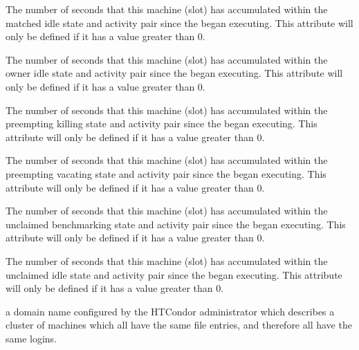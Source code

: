 \begin{description}
%
\item[\AdAttr{TotalTimeMatchedIdle}:] The number of seconds
that this machine (slot) has accumulated within the
matched idle state and activity pair since the 
began executing.
This attribute will only be defined if it has a value greater than 0.
%
\item[\AdAttr{TotalTimeOwnerIdle}:] The number of seconds
that this machine (slot) has accumulated within the
owner idle state and activity pair since the 
began executing.
This attribute will only be defined if it has a value greater than 0.
%
\item[\AdAttr{TotalTimePreemptingKilling}:] The number of seconds
that this machine (slot) has accumulated within the
preempting killing state and activity pair since the 
began executing.
This attribute will only be defined if it has a value greater than 0.
%
\item[\AdAttr{TotalTimePreemptingVacating}:] The number of seconds
that this machine (slot) has accumulated within the
preempting vacating state and activity pair since the 
began executing.
This attribute will only be defined if it has a value greater than 0.
%
\item[\AdAttr{TotalTimeUnclaimedBenchmarking}:] The number of seconds
that this machine (slot) has accumulated within the
unclaimed benchmarking state and activity pair since the 
began executing.
This attribute will only be defined if it has a value greater than 0.
%
\item[\AdAttr{TotalTimeUnclaimedIdle}:] The number of seconds
that this machine (slot) has accumulated within the
unclaimed idle state and activity pair since the 
began executing.
This attribute will only be defined if it has a value greater than 0.
%
\item[\AdAttr{UidDomain}:] a domain name configured by the HTCondor 
administrator which describes a cluster of machines which all have 
the same  file entries, and therefore all have the same logins.
%
\item[\AdAttr{VirtualMachineID}:] 

\end{description}
